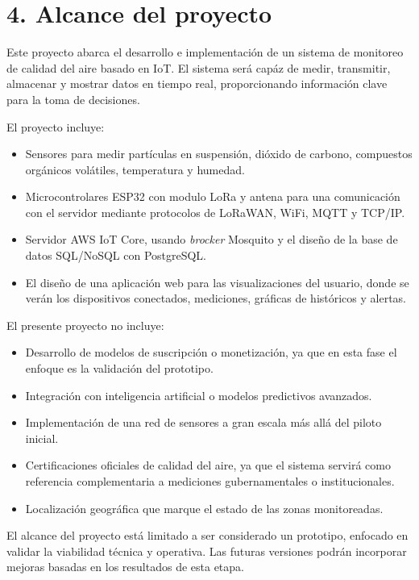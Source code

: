 \documentclass[
11pt, %
]{charter}
\begin{document}
\section{4. Alcance del proyecto}
\label{sec:alcance}

Este proyecto abarca el desarrollo e implementación de un sistema de monitoreo de calidad del aire basado en IoT. El sistema será capáz de medir, transmitir, almacenar y mostrar datos en tiempo real, proporcionando información clave para la toma de decisiones.

El proyecto incluye:

\begin{itemize}
	\item Sensores para medir partículas en suspensión, dióxido de carbono, compuestos orgánicos volátiles, temperatura y humedad.
	\item Microcontrolares ESP32 con modulo LoRa y antena para una comunicación con el servidor mediante protocolos de LoRaWAN, WiFi, MQTT y TCP/IP.
	\item Servidor AWS IoT Core, usando \textit{brocker} Mosquito y el diseño de la base de datos SQL/NoSQL con PostgreSQL.
	\item El diseño de una aplicación web para las visualizaciones del usuario, donde se verán los dispositivos conectados, mediciones, gráficas de históricos y alertas.
	
	
\end{itemize}

El presente proyecto no incluye:
\begin{itemize}
	\item Desarrollo de modelos de suscripción o monetización, ya que en esta fase el enfoque es la validación del prototipo.
	\item Integración con inteligencia artificial o modelos predictivos avanzados.
	\item Implementación de una red de sensores a gran escala más allá del piloto inicial.
	\item Certificaciones oficiales de calidad del aire, ya que el sistema servirá como referencia complementaria a mediciones gubernamentales o institucionales.
	\item Localización geográfica que marque el estado de las zonas monitoreadas.
\end{itemize}

El alcance del proyecto está limitado a ser considerado un prototipo, enfocado en validar la viabilidad técnica y operativa. Las futuras versiones podrán incorporar mejoras basadas en los resultados de esta etapa.
\end{document}
